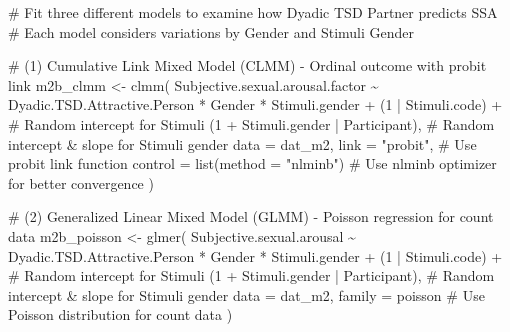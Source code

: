 \documentclass[
  bookmarksnumbered]{article}
\newenvironment{Shaded}{\begin{snugshade}}{\end{snugshade}}
\newcommand{\AttributeTok}[1]{\textcolor[rgb]{0.80,0.80,0.80}{#1}}
\newcommand{\CommentTok}[1]{\textcolor[rgb]{0.50,0.62,0.50}{#1}}
\newcommand{\DecValTok}[1]{\textcolor[rgb]{0.86,0.86,0.80}{#1}}
\newcommand{\FunctionTok}[1]{\textcolor[rgb]{0.94,0.94,0.56}{#1}}
\newcommand{\NormalTok}[1]{\textcolor[rgb]{0.80,0.80,0.80}{#1}}
\newcommand{\OtherTok}[1]{\textcolor[rgb]{0.94,0.94,0.56}{#1}}
\newcommand{\SpecialCharTok}[1]{\textcolor[rgb]{0.86,0.64,0.64}{#1}}
\newcommand{\StringTok}[1]{\textcolor[rgb]{0.80,0.58,0.58}{#1}}
\begin{document}
\begin{Shaded}
\begin{Highlighting}[]
\CommentTok{\# Fit three different models to examine how Dyadic TSD Partner predicts SSA}
\CommentTok{\# Each model considers variations by Gender and Stimuli Gender}

\CommentTok{\# (1) Cumulative Link Mixed Model (CLMM) {-} Ordinal outcome with probit link}
\NormalTok{m2b\_clmm }\OtherTok{\textless{}{-}} \FunctionTok{clmm}\NormalTok{(}
\NormalTok{  Subjective.sexual.arousal.factor }\SpecialCharTok{\textasciitilde{}}\NormalTok{ Dyadic.TSD.Attractive.Person }\SpecialCharTok{*}\NormalTok{ Gender }\SpecialCharTok{*}\NormalTok{ Stimuli.gender }\SpecialCharTok{+}
\NormalTok{    (}\DecValTok{1} \SpecialCharTok{|}\NormalTok{ Stimuli.code) }\SpecialCharTok{+} \CommentTok{\# Random intercept for Stimuli}
\NormalTok{    (}\DecValTok{1} \SpecialCharTok{+}\NormalTok{ Stimuli.gender }\SpecialCharTok{|}\NormalTok{ Participant), }\CommentTok{\# Random intercept \& slope for Stimuli gender}
  \AttributeTok{data =}\NormalTok{ dat\_m2,}
  \AttributeTok{link =} \StringTok{"probit"}\NormalTok{, }\CommentTok{\# Use probit link function}
  \AttributeTok{control =} \FunctionTok{list}\NormalTok{(}\AttributeTok{method =} \StringTok{"nlminb"}\NormalTok{) }\CommentTok{\# Use \textquotesingle{}nlminb\textquotesingle{} optimizer for better convergence}
\NormalTok{)}

\CommentTok{\# (2) Generalized Linear Mixed Model (GLMM) {-} Poisson regression for count data}
\NormalTok{m2b\_poisson }\OtherTok{\textless{}{-}} \FunctionTok{glmer}\NormalTok{(}
\NormalTok{  Subjective.sexual.arousal }\SpecialCharTok{\textasciitilde{}}\NormalTok{ Dyadic.TSD.Attractive.Person }\SpecialCharTok{*}\NormalTok{ Gender }\SpecialCharTok{*}\NormalTok{ Stimuli.gender }\SpecialCharTok{+}
\NormalTok{    (}\DecValTok{1} \SpecialCharTok{|}\NormalTok{ Stimuli.code) }\SpecialCharTok{+} \CommentTok{\# Random intercept for Stimuli}
\NormalTok{    (}\DecValTok{1} \SpecialCharTok{+}\NormalTok{ Stimuli.gender }\SpecialCharTok{|}\NormalTok{ Participant), }\CommentTok{\# Random intercept \& slope for Stimuli gender}
  \AttributeTok{data =}\NormalTok{ dat\_m2,}
  \AttributeTok{family =}\NormalTok{ poisson }\CommentTok{\# Use Poisson distribution for count data}
\NormalTok{)}


\end{Highlighting}
\end{Shaded}
\end{document}
